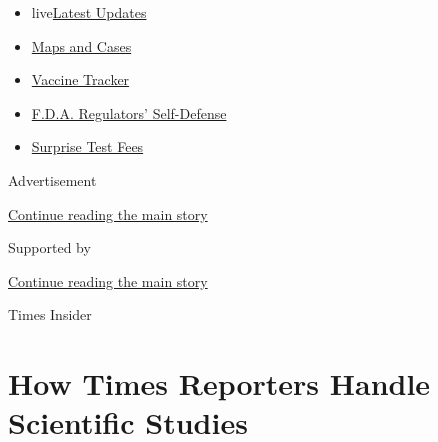 \begin{itemize}
\tightlist
\item
  live\href{https://www.nytimes3xbfgragh.onion/2020/09/11/world/covid-19-coronavirus.html?name=styln-coronavirus-national\&region=TOP_BANNER\&block=storyline_menu_recirc\&action=click\&pgtype=Article\&impression_id=3e70ded1-f4d4-11ea-850c-d13f9cab80f0\&variant=undefined}{Latest
  Updates}
\item
  \href{https://www.nytimes3xbfgragh.onion/interactive/2020/us/coronavirus-us-cases.html?name=styln-coronavirus-national\&region=TOP_BANNER\&block=storyline_menu_recirc\&action=click\&pgtype=Article\&impression_id=3e70ded2-f4d4-11ea-850c-d13f9cab80f0\&variant=undefined}{Maps
  and Cases}
\item
  \href{https://www.nytimes3xbfgragh.onion/interactive/2020/science/coronavirus-vaccine-tracker.html?name=styln-coronavirus-national\&region=TOP_BANNER\&block=storyline_menu_recirc\&action=click\&pgtype=Article\&impression_id=3e7105e0-f4d4-11ea-850c-d13f9cab80f0\&variant=undefined}{Vaccine
  Tracker}
\item
  \href{https://www.nytimes3xbfgragh.onion/2020/09/10/us/politics/fda-coronavirus-vaccine.html?name=styln-coronavirus-national\&region=TOP_BANNER\&block=storyline_menu_recirc\&action=click\&pgtype=Article\&impression_id=3e7105e1-f4d4-11ea-850c-d13f9cab80f0\&variant=undefined}{F.D.A.
  Regulators' Self-Defense}
\item
  \href{https://www.nytimes3xbfgragh.onion/2020/09/09/upshot/coronavirus-surprise-test-fees.html?name=styln-coronavirus-national\&region=TOP_BANNER\&block=storyline_menu_recirc\&action=click\&pgtype=Article\&impression_id=3e7105e2-f4d4-11ea-850c-d13f9cab80f0\&variant=undefined}{Surprise
  Test Fees}
\end{itemize}

Advertisement

\protect\hyperlink{after-top}{Continue reading the main story}

Supported by

\protect\hyperlink{after-sponsor}{Continue reading the main story}

Times Insider

\hypertarget{how-times-reporters-handle-scientific-studies}{%
\section{How Times Reporters Handle Scientific
Studies}\label{how-times-reporters-handle-scientific-studies}}

